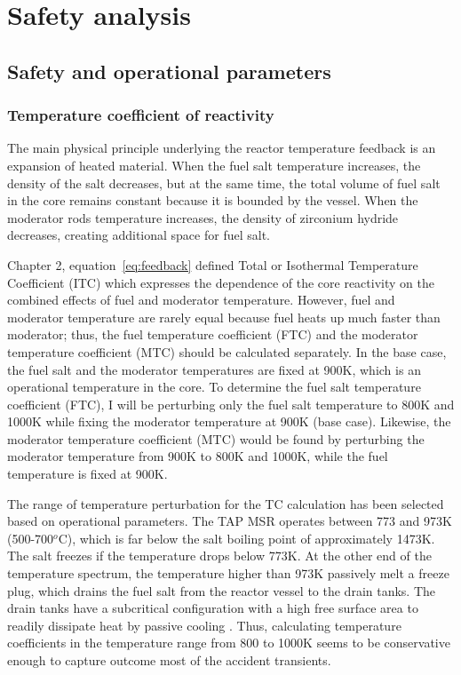 \chapter[Safety analysis]{Safety analysis}

\section{Safety and operational parameters} \label{sec:safety-param}

\subsection{Temperature coefficient of reactivity}
The main physical principle underlying the reactor temperature feedback is an 
expansion of heated material. When the fuel salt temperature increases, the 
density of the salt decreases, but at the same time, the total volume of fuel 
salt in the core remains constant because it is bounded by the vessel. When 
the moderator rods temperature increases, the density of zirconium hydride 
decreases, creating additional space for fuel salt. 

Chapter 2, equation~\ref{eq:feedback} defined Total or Isothermal Temperature 
Coefficient (ITC) which expresses the dependence of the core reactivity on the 
combined effects of fuel and moderator temperature. However, fuel and 
moderator temperature are rarely equal because fuel heats up much faster than 
moderator; thus, the fuel temperature coefficient (FTC) and the moderator 
temperature coefficient (MTC) should be calculated separately. In the base 
case, the fuel salt and the moderator temperatures are fixed at 900K, which is 
an operational temperature in the core. To determine the fuel salt temperature 
coefficient (FTC), I will be perturbing only the fuel salt temperature to 800K 
and 1000K while fixing the moderator temperature at 900K (base case).  
Likewise, the moderator temperature coefficient (MTC) would be found by 
perturbing the moderator temperature from 900K to 800K and 1000K, while the 
fuel temperature is fixed at 900K. 

The range of temperature perturbation for the TC calculation has been selected 
based on operational parameters. The \gls{TAP} \gls{MSR} operates between 773 
and 973K (500-700$^o$C), which is far below the salt boiling point of 
approximately 1473K. The salt freezes if the temperature drops below 773K. At 
the other end of the temperature spectrum, the temperature higher than 973K 
passively melt a freeze plug, which drains the fuel salt from the reactor 
vessel to the drain tanks. The drain tanks have a subcritical configuration 
with a high free surface area to readily dissipate heat by passive cooling 
\cite{transatomic_power_corporation_technical_2016}. Thus, calculating 
temperature coefficients in the temperature range from 800 to 1000K seems to 
be conservative enough to capture outcome most of the accident transients.

